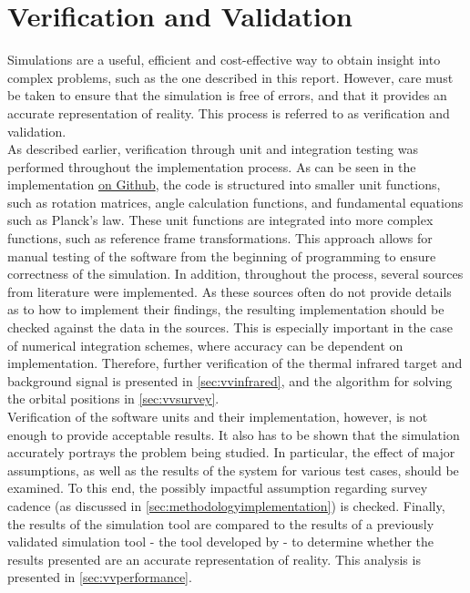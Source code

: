 \chapter{Verification and Validation}
\label{ch:vandv}
Simulations are a useful, efficient and cost-effective way to obtain insight into complex problems, such as the one described in this report. However, care must be taken to ensure that the simulation is free of errors, and that it provides an accurate representation of reality. This process is referred to as verification and validation. \\

As described earlier, verification through unit and integration testing was performed throughout the implementation process. As can be seen in the implementation \href{https://github.com/ArjanVermeulen97/thesis-code.git}{on Github}, the code is structured into smaller unit functions, such as rotation matrices, angle calculation functions, and fundamental equations such as Planck's law. These unit functions are integrated into more complex functions, such as reference frame transformations. This approach allows for manual testing of the software from the beginning of programming to ensure correctness of the simulation. In addition, throughout the process, several sources from literature were implemented. As these sources often do not provide details as to how to implement their findings, the resulting implementation should be checked against the data in the sources. This is especially important in the case of numerical integration schemes, where accuracy can be dependent on implementation. Therefore, further verification of the thermal infrared target and background signal is presented in \autoref{sec:vvinfrared}, and the algorithm for solving the orbital positions in \autoref{sec:vvsurvey}.\\

Verification of the software units and their implementation, however, is not enough to provide acceptable results. It also has to be shown that the simulation accurately portrays the problem being studied. In particular, the effect of major assumptions, as well as the results of the system for various test cases, should be examined. To this end, the possibly impactful assumption regarding survey cadence (as discussed in \autoref{sec:methodologyimplementation}) is checked. Finally, the results of the simulation tool are compared to the results of a previously validated simulation tool - the tool developed by \cite{2017NEOSDT} - to determine whether the results presented are an accurate representation of reality. This analysis is presented in \autoref{sec:vvperformance}.

